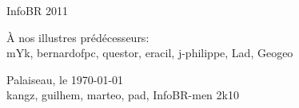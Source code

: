 \thispagestyle{empty}

\begin{center}
\begin{Huge}
InfoBR 2011
\end{Huge}
\end{center}


\begin{flushright}
\begin{large} 
 { \selectfont
\`A nos illustres pr\'ed\'ecesseurs:\\
\smallskip
mYk, bernardofpc, questor, eracil, j-philippe, Lad, Geogeo \\ }
\end{large}
\vspace{1cm}
{Palaiseau, le \today \\
\medskip
 kangz, guilhem, marteo, pad, InfoBR-men 2k10  }
\end{flushright} 



\newpage
\thispagestyle{empty}
\vspace*{1cm}
\newpage
